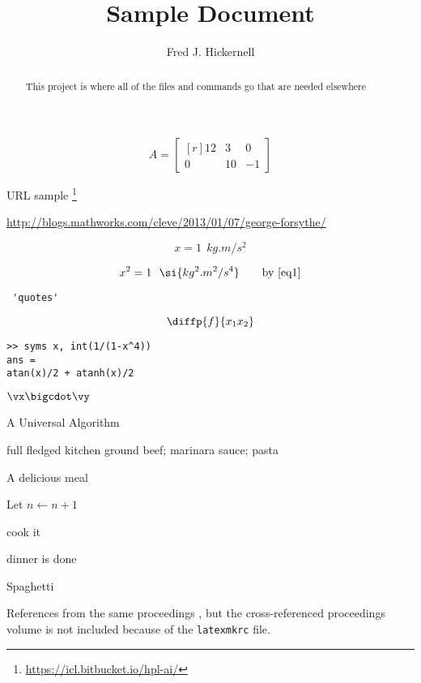 \documentclass{amsart}
\begin{document}
\title{Sample Document}
\author{Fred J. Hickernell}
\begin{abstract}This project is where all of the files and commands go that are needed elsewhere
\end{abstract}

\maketitle

\[
A = \begin{bmatrix*}[r]
     12 & 3  & 0 \\
     0  & 10 &-1 
   \end{bmatrix*}
\]

URL sample \footnote{\url{https://icl.bitbucket.io/hpl-ai/}}

\url{http://blogs.mathworks.com/cleve/2013/01/07/george-forsythe/}

\begin{equation} \label{eq1}
    x = 1 \ \ \si{kg.m/s^2}
\end{equation}

\begin{equation}
    x^2 = 1 \ \ \si{kg^2.m^2/s^4} \qquad \text{by } \eqref{eq1}
\end{equation}

\begin{verbatim} 'quotes' \end{verbatim}

\[
\diffp{f}{{x_1}{x_2}}
\]


\begin{Verbatim}[fontsize=\small,formatcom=\color{blue}]
>> syms x, int(1/(1-x^4))
ans =
atan(x)/2 + atanh(x)/2
\end{Verbatim}

$\vx \bigcdot \vy$

\begin{algorithm}[H]
\caption{A Universal Algorithm \label{alg:basicadapt}}
	\begin{algorithmic}
	\PARAM full fledged kitchen
	\INPUT ground beef; marinara sauce; pasta

    \Ensure A delicious meal

\Repeat

\State Let $n \leftarrow n + 1$

\State cook it

\Until dinner is done

\RETURN Spaghetti

\end{algorithmic}
\end{algorithm}

References from the same proceedings \cite{HicJim16a,JimHic16a}, but the cross-referenced proceedings volume is not included because of the \texttt{latexmkrc} file.



\end{document}
